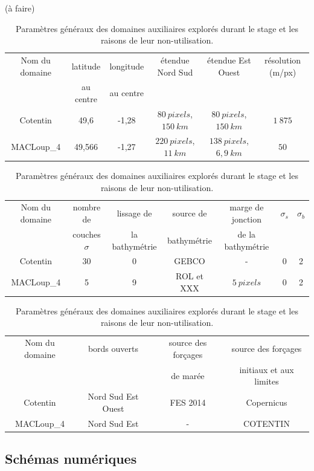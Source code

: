 \documentclass[10pt,a4paper,titlepage]{article}
\begin{document}
\begin{table}[h!]
    \centering 
    (à faire)
    \begin{tabular}{||c||c|c|c|c|c|}
        \hline
        Nom du domaine & latitude & longitude & étendue Nord Sud & étendue Est Ouest & résolution (m/px)\\
        & au centre & au centre &  &  & \\
        \hline
        Cotentin & 49,6 & -1,28 & $80~pixels$, $150~km$ & $80~pixels$, $150~km$ & $1~875$\\
        MACLoup\_4 & 49,566 & -1,27 & $220~pixels$, $11~km$ & $138~pixels$, $6,9~km$ & $50$\\
        \hline
    \end{tabular}\newline
    
    \begin{tabular}{||c||c|c|c|c|c|c|}
        \hline
        Nom du domaine & nombre de & lissage de & source de & marge de jonction & $\sigma_{s}$ & $\sigma_{b}$ \\
        & couches $\sigma$ & la bathymétrie & bathymétrie & de la bathymétrie &  & \\
        \hline
        Cotentin & 30 & 0 & GEBCO & - & 0  & 2 \\
        MACLoup\_4 & 5 & 9 & ROL et XXX & $5~pixels$ & 0 & 2 \\
        \hline
    \end{tabular}\newline
    
    \begin{tabular}{||c||c|c|c|}
        \hline
        Nom du domaine & bords ouverts & source des forçages & source des forçages \\
        &  & de marée & initiaux et aux limites \\
        \hline
        Cotentin & Nord Sud Est Ouest & FES 2014 & Copernicus \\
        MACLoup\_4 & Nord Sud Est & - & COTENTIN \\
        \hline
    \end{tabular}
    \caption{
        Paramètres généraux des domaines auxiliaires explorés durant le stage et les raisons de leur non-utilisation.
    }
    \label{anx:param_generaux_aux}
\end{table}


\subsection{Schémas numériques}
\end{document}
